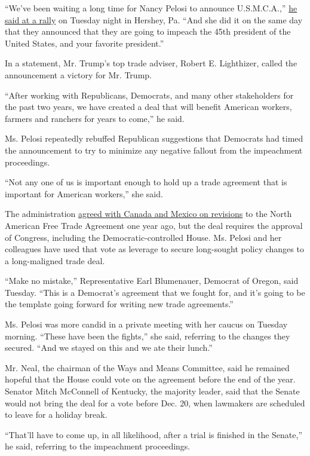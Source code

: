 ``We've been waiting a long time for Nancy Pelosi to announce
U.S.M.C.A.,''
\href{https://www.nytimes.com/2019/12/10/us/politics/trump-impeachment-rally-pennsylvania.html}{he
said at a rally} on Tuesday night in Hershey, Pa. ``And she did it on
the same day that they announced that they are going to impeach the 45th
president of the United States, and your favorite president.''

In a statement, Mr. Trump's top trade adviser, Robert E. Lighthizer,
called the announcement a victory for Mr. Trump.

``After working with Republicans, Democrats, and many other stakeholders
for the past two years, we have created a deal that will benefit
American workers, farmers and ranchers for years to come,'' he said.

Ms. Pelosi repeatedly rebuffed Republican suggestions that Democrats had
timed the announcement to try to minimize any negative fallout from the
impeachment proceedings.

``Not any one of us is important enough to hold up a trade agreement
that is important for American workers,'' she said.

The administration
\href{https://www.nytimes.com/2018/11/30/world/americas/trump-trudeau-canada-mexico.html}{agreed
with Canada and Mexico on revisions} to the North American Free Trade
Agreement one year ago, but the deal requires the approval of Congress,
including the Democratic-controlled House. Ms. Pelosi and her colleagues
have used that vote as leverage to secure long-sought policy changes to
a long-maligned trade deal.

``Make no mistake,'' Representative Earl Blumenauer, Democrat of Oregon,
said Tuesday. ``This is a Democrat's agreement that we fought for, and
it's going to be the template going forward for writing new trade
agreements.''

Ms. Pelosi was more candid in a private meeting with her caucus on
Tuesday morning. ``These have been the fights,'' she said, referring to
the changes they secured. ``And we stayed on this and we ate their
lunch.''

Mr. Neal, the chairman of the Ways and Means Committee, said he remained
hopeful that the House could vote on the agreement before the end of the
year. Senator Mitch McConnell of Kentucky, the majority leader, said
that the Senate would not bring the deal for a vote before Dec. 20, when
lawmakers are scheduled to leave for a holiday break.

``That'll have to come up, in all likelihood, after a trial is finished
in the Senate,'' he said, referring to the impeachment proceedings.

